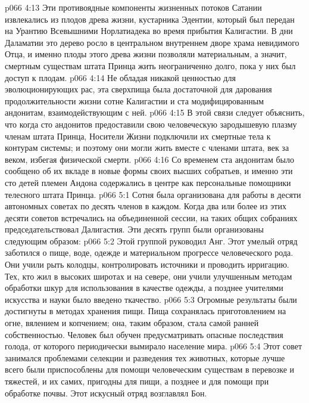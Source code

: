 \vs p066 4:13 Эти противоядные компоненты жизненных потоков Сатании извлекались из плодов древа жизни, кустарника Эдентии, который был передан на Урантию Всевышними Норлатиадека во время прибытия Калигастии. В дни Даламатии это дерево росло в центральном внутреннем дворе храма невидимого Отца, и именно плоды этого древа жизни позволяли материальным, а значит, смертным существам штата Принца жить неограниченно долго, пока у них был доступ к плодам.
\vs p066 4:14 Не обладая никакой ценностью для эволюционирующих рас, эта сверхпища была достаточной для дарования продолжительности жизни сотне Калигастии и ста модифицированным андонитам, взаимодействующим с ней.
\vs p066 4:15 \pc В этой связи следует объяснить, что когда сто андонитов предоставили свою человеческую зародышевую плазму членам штата Принца, Носители Жизни подключили их смертные тела к контурам системы; и поэтому они могли жить вместе с членами штата, век за веком, избегая физической смерти.
\vs p066 4:16 Со временем ста андонитам было сообщено об их вкладе в новые формы своих высших собратьев, и именно эти сто детей племен Андона содержались в центре как персональные помощники телесного штата Принца.
\vs p066 5:1 Сотня была организована для работы в десяти автономных советах по десять членов в каждом. Когда два или более из этих десяти советов встречались на объединенной сессии, на таких общих собраниях председательствовал Далигастия. Эти десять групп были организованы следующим образом:
\vs p066 5:2 \bibnobreakspace {} Этой группой руководил Анг. Этот умелый отряд заботился о пище, воде, одежде и материальном прогрессе человеческого рода. Они учили рыть колодцы, контролировать источники и проводить ирригацию. Тех, кто жил в высоких широтах и на севере, они учили улучшенным методам обработки шкур для использования в качестве одежды, а позднее учителями искусства и науки было введено ткачество.
\vs p066 5:3 Огромные результаты были достигнуты в методах хранения пищи. Пища сохранялась приготовлением на огне, вялением и копчением; она, таким образом, стала самой ранней собственностью. Человек был обучен предусматривать опасные последствия голода, от которого периодически вымирало население мира.
\vs p066 5:4 \bibnobreakspace {} Этот совет занимался проблемами селекции и разведения тех животных, которые лучше всего были приспособлены для помощи человеческим существам в перевозке и тяжестей, и их самих, пригодны для пищи, а позднее и для помощи при обработке почвы. Этот искусный отряд возглавлял Бон.

